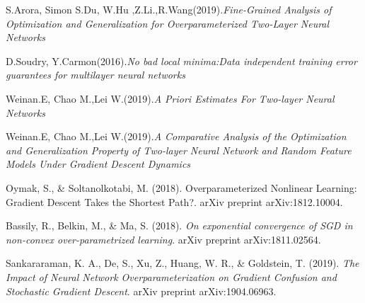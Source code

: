 \documentclass{article}
\begin{document}
\begin{thebibliography}{9}
S.Arora, Simon S.Du, W.Hu ,Z.Li.,R.Wang(2019).\textit{Fine-Grained Analysis of Optimization and Generalization for Overparameterized Two-Layer Neural Networks}

D.Soudry, Y.Carmon(2016).\textit{No bad local minima:Data independent training error guarantees for multilayer neural networks}

Weinan.E, Chao M.,Lei W.(2019).\textit{A Priori Estimates For Two-layer Neural Networks}

Weinan.E, Chao M.,Lei W.(2019).\textit{A Comparative Analysis of the Optimization and Generalization Property of Two-layer Neural Network and Random Feature Models Under Gradient Descent Dynamics}

Oymak, S., \& Soltanolkotabi, M. (2018). Overparameterized Nonlinear Learning: Gradient Descent Takes the Shortest Path?. arXiv preprint arXiv:1812.10004.

Bassily, R., Belkin, M., \& Ma, S. (2018). \textit{On exponential convergence of SGD in non-convex over-parametrized learning}. arXiv preprint arXiv:1811.02564.

Sankararaman, K. A., De, S., Xu, Z., Huang, W. R., \& Goldstein, T. (2019). \textit{The Impact of Neural Network Overparameterization on Gradient Confusion and Stochastic Gradient Descent}. arXiv preprint arXiv:1904.06963.

\end{thebibliography}
\end{document}
